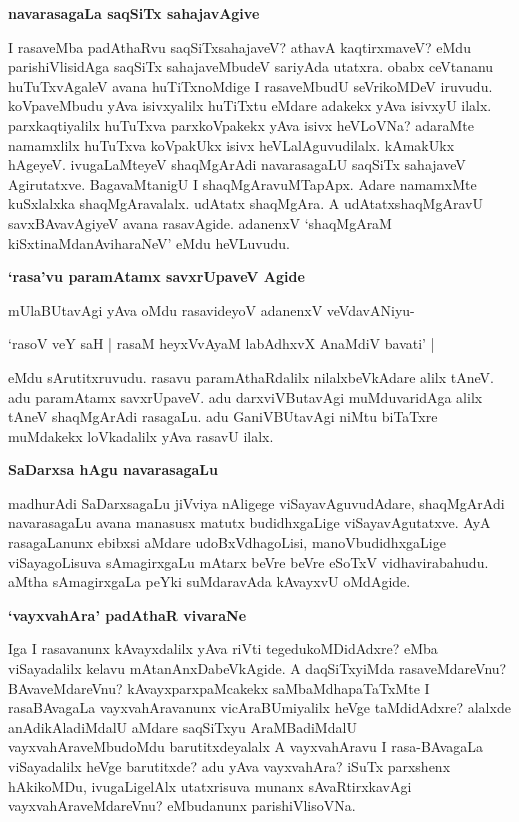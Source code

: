 {\bigskip
\noindent
{\large\bf navarasagaLa saqSiTx sahajavAgive}}\label{page222}
\medskip

\noindent
I rasaveMba padAthaRvu saqSiTxsahajaveV? athavA kaqtirxmaveV? eMdu pari\-shiVlisidAga saqSiTx sahaja\-veMbudeV sariyAda utatxra. obabx ceVtananu huTuTxvAgaleV avana huTiTxnoMdige I rasaveMbudU seVrikoMDeV iruvudu. koVpaveMbudu yAva isivxyalilx huTiTxtu eMdare adakekx yAva isivxyU ilalx. parxkaqtiyalilx huTuTxva parxkoVpakekx yAva isivx heVLoVNa? adaraMte namamxlilx huTuTxva koVpakUkx isivx heVLalAguvudilalx. kAmakUkx hAgeyeV. ivugaLaMteyeV shaqMgArAdi navarasagaLU saqSiTx sahajaveV Agirutatxve. BagavaMtanigU I shaqMgAravuMTapApx. Adare namamxMte kuSxlalxka shaqMgAravalalx. udAtatx shaqMgAra. A udAtatxshaqMgAravU savxBAvavAgiyeV avana rasavAgide. adanenxV `shaqMgAraM kiSxtinaMdanAviharaNeV' eMdu heVLuvudu.

{\bigskip
\noindent
{\large\bf `rasa'vu paramAtamx savxrUpaveV Agide}}\label{page222}
\medskip

\noindent
mUlaBUtavAgi yAva oMdu rasavideyoV adanenxV veVdavANiyu-

\begin{shloka}
`rasoV veY saH | rasaM heyxVvAyaM labAdhxvX AnaMdiV bavati' |
\end{shloka}

\noindent
eMdu sArutitxruvudu. rasavu paramAthaRdalilx nilalxbeVkAdare alilx tAneV. adu paramAtamx savxrU\-paveV. adu darxviVButavAgi muMduvaridAga alilx tAneV shaqMgArAdi rasagaLu. adu GaniVBUtavAgi niMtu biTaTxre muMdakekx loVkadalilx yAva rasavU ilalx.

{\bigskip
\noindent
{\large\bf SaDarxsa hAgu navarasagaLu}}\label{page223}
\medskip

\noindent
madhurAdi SaDarxsagaLu jiVviya nAligege viSayavAguvudAdare, shaqMgArAdi navarasagaLu avana manasusx matutx budidhxgaLige viSayavAgutatxve. AyA rasagaLanunx ebibxsi aMdare udoBxVdhagoLisi, manoV\-budidhxgaLige viSayagoLisuva sAmagirxgaLu mAtarx beVre beVre eSoTxV vidhavirabahudu. aMtha sAmagirxgaLa peYki suMdaravAda kAvayxvU oMdAgide. 

{\bigskip
\noindent
{\large\bf `vayxvahAra' padAthaR vivaraNe}}\label{page223}
\medskip

\noindent
Iga I rasavanunx kAvayxdalilx yAva riVti tegedukoMDidAdxre? eMba viSayadalilx kelavu mAtanAnxDa\-beVkAgide. A daqSiTxyiMda rasaveMdareVnu? BAvaveMdareVnu? kAvayxparxpaMcakekx saMbaMdhapaTaTxMte I rasaBAvagaLa vayxvahAravanunx vicAraBUmi\-yalilx heVge taMdidAdxre? alalxde anAdikAladiMdalU aMdare saqSiTxyu AraMBadiMdalU vayxvahAraveMbudoMdu barutitxdeyalalx A vayxvahAravu I rasa-BAvagaLa viSayadalilx heVge barutitxde? adu yAva vayxvahAra? iSuTx parxshenx hAkikoMDu, ivugaLigelAlx utatxrisuva munanx sAvaRtirxkavAgi vayxvahAraveMdareVnu? eMbudanunx parishiVlisoVNa.

